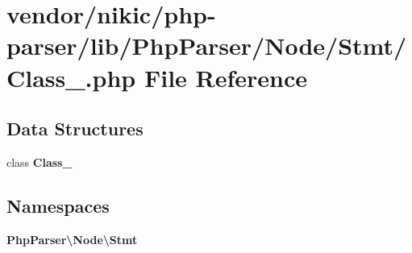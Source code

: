 \section{vendor/nikic/php-\/parser/lib/\+Php\+Parser/\+Node/\+Stmt/\+Class\+\_\+.php File Reference}
\label{_node_2_stmt_2_class___8php}
\subsection*{Data Structures}
\begin{DoxyCompactItemize}
\item 
class {\bf Class\+\_\+}
\end{DoxyCompactItemize}
\subsection*{Namespaces}
\begin{DoxyCompactItemize}
\item 
 {\bf Php\+Parser\textbackslash{}\+Node\textbackslash{}\+Stmt}
\end{DoxyCompactItemize}
